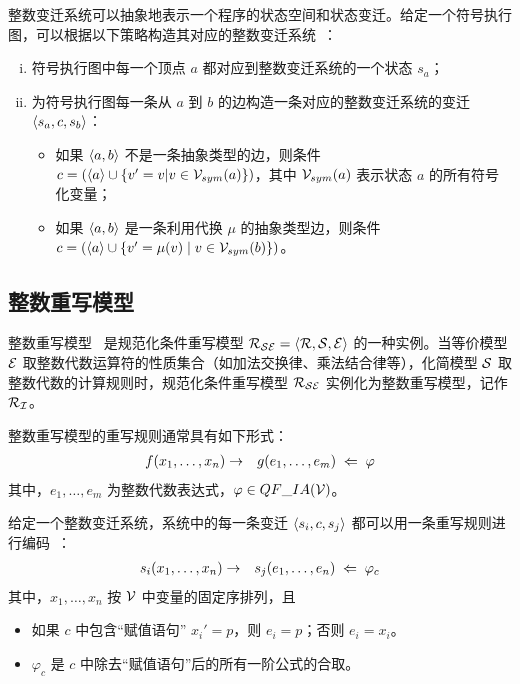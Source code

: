 整数变迁系统可以抽象地表示一个程序的状态空间和状态变迁。给定一个符号执行图，可以根据以下策略构造其对应的整数变迁系统~\cite{DBLP:conf/cade/StroderGBFFHS14,DBLP:journals/jar/StroderGBFFHSA17}：
\begin{enumerate} [(i)]
\item 符号执行图中每一个顶点 $a$ 都对应到整数变迁系统的一个状态 $s_a$；
\item 为符号执行图每一条从 $a$ 到 $b$ 的边构造一条对应的整数变迁系统的变迁 $\langle s_a, c, s_b\rangle$：
\begin{itemize}
\item 如果 $\langle a, b\rangle$ 不是一条抽象类型的边，则条件 $c = (\langle a\rangle \cup \{v' = v | v\in\mathcal{V}_{sym}(a)\})$，其中 $\mathcal{V}_{sym}(a)$ 表示状态 $a$ 的所有符号化变量；
\item 如果 $\langle a, b\rangle$ 是一条利用代换 $\mu$ 的抽象类型边，则条件 $c = (\langle a\rangle \cup \{v'=\mu(v) \mid v\in\mathcal{V}_{sym}(b)\})$。
\end{itemize}
\end{enumerate}

\subsection{整数重写模型}
整数重写模型~\cite{DBLP:conf/rta/FalkeKS11} 是规范化条件重写模型 $\mathcal{R}_{\mathcal{S}\mathcal{E}} = \langle \mathcal{R},\mathcal{S},\mathcal{E} \rangle$ 的一种实例。当等价模型 $\mathcal{E}$ 取整数代数运算符的性质集合（如加法交换律、乘法结合律等），化简模型 $\mathcal{S}$ 取整数代数的计算规则时，规范化条件重写模型 $\mathcal{R}_{\mathcal{S}\mathcal{E}}$ 实例化为整数重写模型，记作 $\mathcal{R}_{\mathcal{I}}$。

整数重写模型的重写规则通常具有如下形式：
\begin{eqnarray}
f(x_1,\ldots,x_n) & \rightarrow & g(e_1,\ldots,e_m) \;\Leftarrow\; \varphi \nonumber
\end{eqnarray}
其中，$e_1,\ldots,e_m$ 为整数代数表达式，$\varphi\in QF\_IA(\mathcal{V})$。

给定一个整数变迁系统，系统中的每一条变迁 $\langle s_i, c, s_j \rangle$ 都可以用一条重写规则进行编码~\cite{DBLP:conf/cade/FalkeK09,DBLP:conf/rta/FalkeKS11}：
\begin{eqnarray}
s_i(x_1,\ldots,x_n) & \rightarrow & s_j(e_1,\dots,e_n) \;\Leftarrow\; \varphi_c \nonumber
\end{eqnarray}
其中，$x_1,\ldots,x_n$ 按 $\mathcal{V}$ 中变量的固定序排列，且
\begin{itemize}
\item 如果 $c$ 中包含“赋值语句” $x_i' = p$，则 $e_i = p$；否则 $e_i = x_i$。
\item $\varphi_c$ 是 $c$ 中除去“赋值语句”后的所有一阶公式的合取。
\end{itemize}

